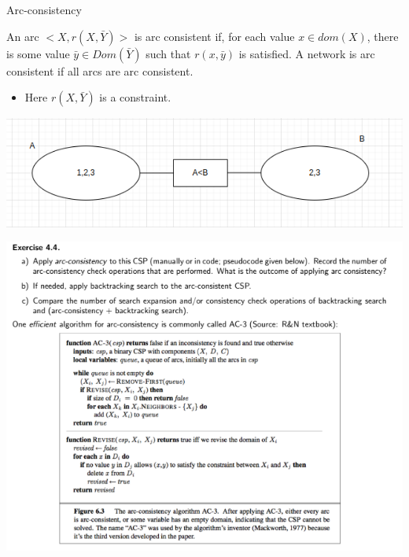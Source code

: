 \documentclass[11pt]{beamer}
\begin{document}
\begin{frame}{Arc-consistency}
\begin{definition}
An arc $<X, r(X,\bar{Y})>$ is arc consistent if, for each value $x\in dom(X)$, there is some value $\bar{y}\in Dom(\bar{Y})$ such that $r(x,\bar{y})$ is satisfied. A network is arc consistent if all arcs are arc consistent.
\end{definition}
\pause
\begin{itemize}
	\item Here $r(X,\bar{Y})$ is a constraint.
\end{itemize}
\pause
\includegraphics[scale=0.3]{images/699.png}
\end{frame}

\begin{frame}{4.4}
\includegraphics[scale=0.4]{images/44.png}
\end{frame}
\end{document}
